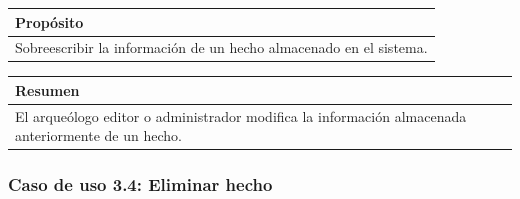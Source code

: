     \begin{table}[H]
        \centering
        \begin{tabularx}{\textwidth}{@{} |L |@{}} \hline
            \textbf{Propósito} \\
            \hline
            Sobreescribir la información de un hecho almacenado en el sistema. \\
            \hline
        \end{tabularx}
    \end{table}

    \begin{table}[H]
        \centering
        \begin{tabularx}{\textwidth}{@{} |L |@{}} \hline
            \textbf{Resumen} \\
            \hline
            El arqueólogo editor o administrador modifica la información almacenada
            anteriormente de un hecho.\\
            \hline
        \end{tabularx}
    \end{table}

\subsubsection{Caso de uso 3.4: Eliminar hecho}

